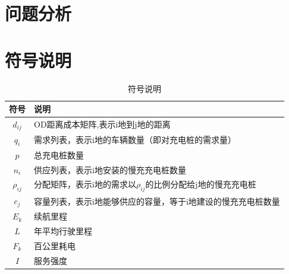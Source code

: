 \documentclass[12pt, a4paper, oneside]{ctexart}
\begin{document}
\section{问题分析}

\section{符号说明}
\begin{table}[h]
    \caption{符号说明}
    \centering
    \renewcommand{\arraystretch}{2}
    \begin{tabular*}{\textwidth}{c||l}%
        \toprule[1.5mm]
        \Large{\textbf{符号}} & \Large{\textbf{说明}} \\
        \midrule[1.5pt]
        \(d_{ij}\) & OD距离成本矩阵,表示i地到j地的距离 \\\hline
        \(q_i\)&需求列表，表示i地的车辆数量（即对充电桩的需求量）\\\hline
        \(p\)&总充电桩数量\\\hline
        \(n_i\)&供应列表，表示i地安装的慢充充电桩数量\\\hline
        \(\rho_{ij}\)&分配矩阵，表示i地的需求以\(\rho_{ij}\)的比例分配给j地的慢充充电桩\\\hline
        \(c_j\)&容量列表，表示i地能够供应的容量，等于i地建设的慢充充电桩数量\\\hline
        \(E_k\)&续航里程\\\hline
        \(L\)&年平均行驶里程\\\hline
        \(F_k\)&百公里耗电\\\hline
        \(I\)&服务强度\\\hline
        \bottomrule[1mm]
    \end{tabular*}
\end{table}
\end{document}
